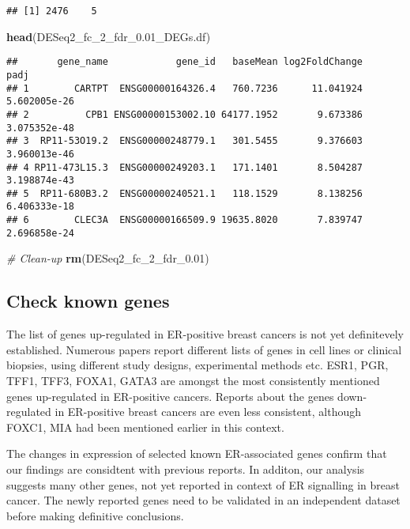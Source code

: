 \documentclass[]{book}
\newenvironment{Shaded}{\begin{snugshade}}{\end{snugshade}}
\newcommand{\KeywordTok}[1]{\textcolor[rgb]{0.13,0.29,0.53}{\textbf{#1}}}
\newcommand{\FloatTok}[1]{\textcolor[rgb]{0.00,0.00,0.81}{#1}}
\newcommand{\CommentTok}[1]{\textcolor[rgb]{0.56,0.35,0.01}{\textit{#1}}}
\newcommand{\NormalTok}[1]{#1}
\begin{document}
\begin{verbatim}
## [1] 2476    5
\end{verbatim}

\begin{Shaded}
\begin{Highlighting}[]
\KeywordTok{head}\NormalTok{(DESeq2_fc_2_fdr_}\FloatTok{0.}\NormalTok{01_DEGs.df)}
\end{Highlighting}
\end{Shaded}

\begin{verbatim}
##       gene_name            gene_id   baseMean log2FoldChange         padj
## 1        CARTPT  ENSG00000164326.4   760.7236      11.041924 5.602005e-26
## 2          CPB1 ENSG00000153002.10 64177.1952       9.673386 3.075352e-48
## 3  RP11-53O19.2  ENSG00000248779.1   301.5455       9.376603 3.960013e-46
## 4 RP11-473L15.3  ENSG00000249203.1   171.1401       8.504287 3.198874e-43
## 5  RP11-680B3.2  ENSG00000240521.1   118.1529       8.138256 6.406333e-18
## 6        CLEC3A  ENSG00000166509.9 19635.8020       7.839747 2.696858e-24
\end{verbatim}

\begin{Shaded}
\begin{Highlighting}[]
\CommentTok{# Clean-up}
\KeywordTok{rm}\NormalTok{(DESeq2_fc_2_fdr_}\FloatTok{0.01}\NormalTok{)}
\end{Highlighting}
\end{Shaded}

\subsection{Check known genes}\label{check-known-genes}

The list of genes up-regulated in ER-positive breast cancers is not yet
definitevely established. Numerous papers report different lists of
genes in cell lines or clinical biopsies, using different study designs,
experimental methods etc. ESR1, PGR, TFF1, TFF3, FOXA1, GATA3 are
amongst the most consistently mentioned genes up-regulated in
ER-positive cancers. Reports about the genes down-regulated in
ER-positive breast cancers are even less consistent, although FOXC1, MIA
had been mentioned earlier in this context.

The changes in expression of selected known ER-associated genes confirm
that our findings are considtent with previous reports. In additon, our
analysis suggests many other genes, not yet reported in context of ER
signalling in breast cancer. The newly reported genes need to be
validated in an independent dataset before making definitive
conclusions.
\end{document}
